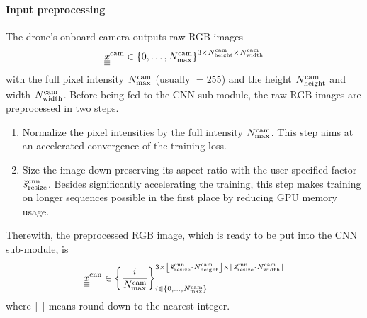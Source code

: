\paragraph*{Input preprocessing} ${}$\\
The drone's onboard camera 
outputs raw RGB images
\begin{equation}
    \img[]{\camera}{}{}{}
    \in 
    \left\{ 0, \dots, \num[]{\camera}{\mxm}{}{} \right\}^{
        3 \times
        \num[]{\camera}{\height}{}{}
        \times 
        \num[]{\camera}{\widthh}{}{}
    }
\end{equation}
with the full pixel intensity $\num[]{\camera}{\mxm}{}{}$ (usually $= 255$)
and  the height $\num[]{\camera}{\height}{}{}$ 
and width $\num[]{\camera}{\widthh}{}{}$.
Before being fed to the CNN sub-module,
the raw RGB images are preprocessed in two steps.
\begin{enumerate}
    \item Normalize the pixel intensities by the full intensity 
    $\num[]{\camera}{\mxm}{}{}$. 
    This step aims at an accelerated convergence of the training loss.
    \item Size the image down 
    preserving its aspect ratio
    with the user-specified factor
    $\anything[\user]{\cnn}{\text{resize}}{}{}{s}$.
    Besides significantly accelerating the training,
    this step makes training on longer sequences possible
    in the first place by reducing GPU memory usage.
\end{enumerate}
Therewith, the preprocessed RGB image,
which is ready to be put into the CNN sub-module, 
is
\begin{equation} \label{eq:rgb_preproc}
    \img[]{\cnn}{}{}{}
    \in 
    \left\{ \frac{i}{\num[]{\camera}{\mxm}{}{}} \right\}_{
        i \in \left\{0, \dots, \num[]{\camera}{\mxm}{}{}\right\}
    }^{
        3 \times
        \left\lfloor 
            \anything[\user]{\cnn}{\text{resize}}{}{}{s}
            \cdot
            \num[]{\camera}{\height}{}{}
        \right\rfloor
        \times 
        \left\lfloor 
            \anything[\user]{\cnn}{\text{resize}}{}{}{s}
            \cdot
            \num[]{\camera}{\widthh}{}{}
        \right\rfloor
    }
\end{equation} 
where $\lfloor\ \rfloor$ means round down to the nearest integer.


